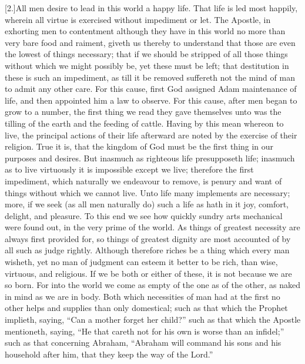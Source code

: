 [2.]All men desire to lead in this world a happy life. That life is led most happily, wherein all virtue is exercised without impediment or let. The Apostle, in exhorting men to contentment although they have in this world no more than very bare food and raiment, giveth us thereby to understand that those are even the lowest of things necessary; that if we should be stripped of all those things without which we might possibly be, yet these must be left; that destitution in these is such an impediment, as till it be removed suffereth not the mind of man to admit any other care. For this cause, first God assigned Adam maintenance of life, and then appointed him a law to observe. For this cause, after men began to grow to a number, the first thing we read they gave themselves unto was the tilling of the earth and the feeding of cattle. Having by this mean whereon to live, the principal actions of their life afterward are noted by the exercise of their religion. True it is, that the kingdom of God must be the first thing in our purposes and desires. But inasmuch as righteous life presupposeth life; inasmuch as to live virtuously it is impossible except we live; therefore the first impediment, which naturally we endeavour to remove, is penury and want of things without which we cannot live. Unto life many implements are necessary; more, if we seek (as all men naturally do) such a life as hath in it joy, comfort, delight, and pleasure. To this end we see how quickly sundry arts mechanical were found out, in the very prime of the world. As things of greatest  necessity are always first provided for, so things of greatest dignity are most accounted of by all such as judge rightly. Although therefore riches be a thing which every man wisheth, yet no man of judgment can esteem it better to be rich, than wise, virtuous, and religious. If we be both or either of these, it is not because we are so born. For into the world we come as empty of the one as of the other, as naked in mind as we are in body. Both which necessities of man had at the first no other helps and supplies than only domestical; such as that which the Prophet implieth, saying, “Can a mother forget her child?” such as that which the Apostle mentioneth, saying, “He that careth not for his own is worse than an infidel;” such as that concerning Abraham, “Abraham will command his sons and his household after him, that they keep the way of the Lord.”

